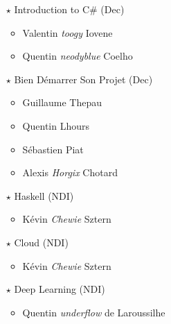 \documentclass[a4paper]{article}
\begin{document}
\begin{multicols*}{2}
\begin{itemize}
            \vspace{0.3cm}

        \item[$\star$] Introduction to C\# (Dec)
            \begin{itemize}
                \item Valentin \emph{toogy} Iovene
                \item Quentin \emph{neodyblue} Coelho
            \end{itemize}

            \vspace{0.3cm}

        \item[$\star$] Bien Démarrer Son Projet (Dec)
            \begin{itemize}
                \item Guillaume Thepau
                \item Quentin Lhours
                \item Sébastien Piat
                \item Alexis \emph{Horgix} Chotard
            \end{itemize}

            \vspace{0.3cm}

        \item[$\star$] Haskell (NDI)
            \begin{itemize}
                \item Kévin \emph{Chewie} Sztern
            \end{itemize}

            \vspace{0.3cm}

        \item[$\star$] Cloud (NDI)
            \begin{itemize}
                \item Kévin \emph{Chewie} Sztern
            \end{itemize}

            \vspace{0.3cm}

        \item[$\star$] Deep Learning (NDI)
            \begin{itemize}
                \item Quentin \emph{underflow} de Laroussilhe
            \end{itemize}


\end{itemize}
\end{multicols*}
\end{document}
